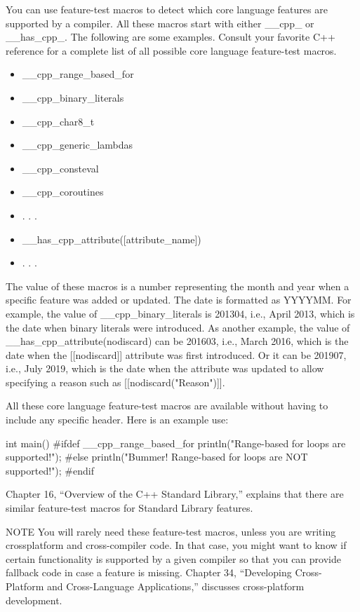 
You can use feature-test macros to detect which core language features are supported by a compiler. All these macros start with either \_\_cpp\_ or \_\_has\_cpp\_. The following are some examples. Consult your favorite C++ reference for a complete list of all possible core language feature-test macros.

\begin{itemize}
\item
\_\_cpp\_range\_based\_for

\item
\_\_cpp\_binary\_literals

\item
\_\_cpp\_char8\_t

\item
\_\_cpp\_generic\_lambdas

\item
\_\_cpp\_consteval

\item
\_\_cpp\_coroutines

\item
. . .

\item
\_\_has\_cpp\_attribute([attribute\_name])

\item
. . .
\end{itemize}

The value of these macros is a number representing the month and year when a specific feature was added or updated. The date is formatted as YYYYMM. For example, the value of \_\_cpp\_binary\_literals is 201304, i.e., April 2013, which is the date when binary literals were introduced. As another example, the value of \_\_has\_cpp\_attribute(nodiscard) can be 201603, i.e., March 2016, which is the date when the [[nodiscard]] attribute was first introduced. Or it can be 201907, i.e., July 2019, which is the date when the attribute was updated to allow specifying a reason such as [[nodiscard("Reason")]].

All these core language feature-test macros are available without having to include any specific header. Here is an example use:

\begin{cpp}
int main()
{
#ifdef __cpp_range_based_for
    println("Range-based for loops are supported!");
#else
    println("Bummer! Range-based for loops are NOT supported!");
#endif
}
\end{cpp}

Chapter 16, “Overview of the C++ Standard Library,” explains that there are similar feature-test macros for Standard Library features.

\begin{myNotic}{NOTE}
You will rarely need these feature-test macros, unless you are writing crossplatform and cross-compiler code. In that case, you might want to know if certain functionality is supported by a given compiler so that you can provide fallback code in case a feature is missing. Chapter 34, “Developing Cross-Platform and Cross-Language Applications,” discusses cross-platform development.
\end{myNotic}



